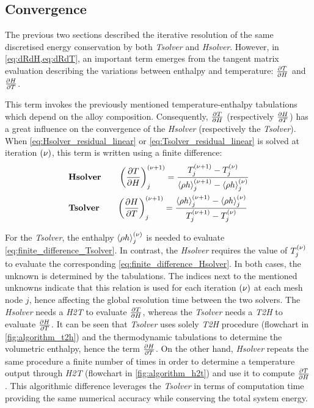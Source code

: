 \subsection{Convergence}
%
The previous two sections described the iterative resolution of the same discretised energy 
conservation by both \emph{Tsolver} and \emph{Hsolver}. However, in \cref{eq:dRdH,eq:dRdT}, an important 
term emerges from the tangent matrix evaluation describing the variations between enthalpy and temperature: 
$\frac{\partial T}{\partial H}$ and $\frac{\partial H}{\partial T}$. 

This term invokes the previously mentioned temperature-enthalpy 
tabulations which depend on the alloy composition. Consequently,  $\frac{\partial T}{\partial H}$ (respectively $\frac{\partial H}{\partial T}$)
has a great influence on the convergence of the \emph{Hsolver} (respectively the \emph{Tsolver}). 
When \cref{eq:Hsolver_residual_linear} or \cref{eq:Tsolver_residual_linear} 
is solved at iteration ${\left( \nu \right)}$, this term is written using a finite difference:
\begin{align}
\label{eq:finite_difference_Hsolver}
& \textbf{Hsolver} \qquad \left( \frac{\partial T}{\partial H} \right)^{{\left( \nu+1 \right)}}_{j} = \frac{T_j^{{\left( \nu+1 \right)}} - T_j^{{\left( \nu \right)}}}{\left \langle  \rho h  \right \rangle_j^{{\left( \nu+1 \right)}} - \left \langle  \rho h  \right \rangle_j^{{\left( \nu \right)}}} \\ 
\label{eq:finite_difference_Tsolver}
& \textbf{Tsolver} \qquad \left( \frac{\partial H}{\partial T} \right)^{{\left( \nu+1 \right)}}_{j} = \frac{\left \langle  \rho h  \right \rangle_j^{{\left( \nu+1 \right)}} - \left \langle  \rho h  \right \rangle_j^{{\left( \nu \right)}}}{T_j^{{\left( \nu+1 \right)}} - T_j^{{\left( \nu \right)}}}
\end{align}

For the \emph{Tsolver}, the enthalpy $\left \langle  \rho h  \right \rangle_j^{{\left( \nu \right)}}$ is needed to evaluate \cref{eq:finite_difference_Tsolver}. 
In contrast, the \emph{Hsolver} requires the value of $T_j^{{\left( \nu \right)}}$ to evaluate the corresponding \cref{eq:finite_difference_Hsolver}.
In both cases, the unknown is determined by the tabulations. The indices next to the mentioned unknowns
indicate that this relation is used for each iteration ${\left( \nu \right)}$ at each mesh node $j$, 
hence affecting the global resolution time 
between the two solvers. The \emph{Hsolver} needs a \emph{H2T} to evaluate $\frac{\partial T}{\partial H}$, 
whereas the \emph{Tsolver} needs a \emph{T2H} to evaluate $\frac{\partial H}{\partial T}$.
It can be seen that \emph{Tsolver} uses solely \emph{T2H} procedure 
(flowchart in \cref{fig:algorithm_t2h}) and the thermodynamic tabulations to determine the volumetric enthalpy, 
hence the term $\frac{\partial H}{\partial T}$. On the other hand, \emph{Hsolver} repeats the same procedure a finite number of times in order to 
determine a temperature output through \emph{H2T} (flowchart in \cref{fig:algorithm_h2t}) and use it to compute $\frac{\partial T}{\partial H}$. 
This algorithmic difference leverages the 
\emph{Tsolver} in terms of computation time providing 
the same numerical accuracy while conserving the total system energy. 

